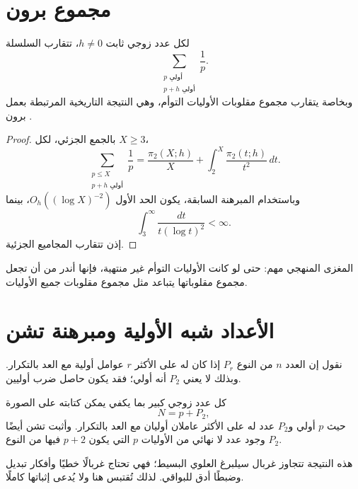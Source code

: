 \section{مجموع برون}

\begin{corollary}
\label{cor:chapter16-brun-sum}
\provedhere
لكل عدد زوجي ثابت \(h\ne0\)، تتقارب السلسلة
\[
 \sum_{\substack{p\text{ أولي}\\p+h\text{ أولي}}}\frac1p.
\]
وبخاصة يتقارب مجموع مقلوبات الأوليات التوأم، وهي النتيجة التاريخية المرتبطة
بعمل برون \cite{Brun1919TwinPrimeReciprocals}.
\end{corollary}

\begin{proof}
بالجمع الجزئي، لكل \(X\ge3\)،
\[
 \sum_{\substack{p\le X\\p+h\text{ أولي}}}\frac1p
 =
 \frac{\pi_2(X;h)}{X}
 +
 \int_2^X\frac{\pi_2(t;h)}{t^2}\,dt.
\]
وباستخدام المبرهنة السابقة، يكون الحد الأول \(O_h((\log X)^{-2})\)، بينما
\[
 \int_3^\infty \frac{dt}{t(\log t)^2}<\infty.
\]
إذن تتقارب المجاميع الجزئية.
\end{proof}

المغزى المنهجي مهم: حتى لو كانت الأوليات التوأم غير منتهية، فإنها أندر من أن
تجعل مجموع مقلوباتها يتباعد مثل مجموع مقلوبات جميع الأوليات.

\section{الأعداد شبه الأولية ومبرهنة تشن}

نقول إن العدد \(n\) من النوع \(P_r\) إذا كان له على الأكثر \(r\) عوامل أولية
مع العد بالتكرار. وبذلك لا يعني \(P_2\) أنه أولي؛ فقد يكون حاصل ضرب أوليين.

\begin{theorem}
\label{thm:chapter16-chen}
كل عدد زوجي كبير بما يكفي يمكن كتابته على الصورة
\[
 N=p+P_2,
\]
حيث \(p\) أولي و\(P_2\) عدد له على الأكثر عاملان أوليان مع العد بالتكرار.
وأثبت تشن أيضًا وجود عدد لا نهائي من الأوليات \(p\) التي يكون
\(p+2\) فيها من النوع \(P_2\).
\end{theorem}

هذه النتيجة تتجاوز غربال سيلبرغ العلوي البسيط؛ فهي تحتاج غربالًا خطيًا وأفكار
تبديل وضبطًا أدق للبواقي. لذلك تُقتبس هنا ولا يُدعى إثباتها كاملًا.

